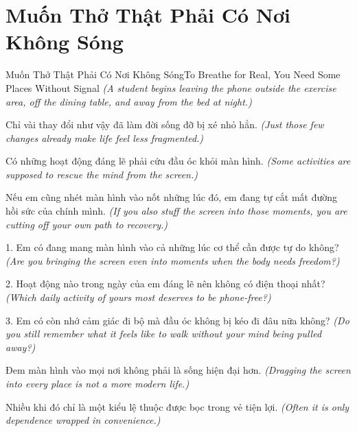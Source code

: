 \section{Muốn Thở Thật Phải Có Nơi Không Sóng}
\begin{truyen}{Muốn Thở Thật Phải Có Nơi Không Sóng}{To Breathe for Real, You Need Some Places Without Signal}
\textit{(A student begins leaving the phone outside the exercise area, off the dining table, and away from the bed at night.)}

Chỉ vài thay đổi như vậy đã làm đời sống đỡ bị xé nhỏ hẳn.
\textit{(Just those few changes already make life feel less fragmented.)}

\end{truyen}

\begin{baihoc}
Có những hoạt động đáng lẽ phải cứu đầu óc khỏi màn hình.
\textit{(Some activities are supposed to rescue the mind from the screen.)}

Nếu em cũng nhét màn hình vào nốt những lúc đó, em đang tự cắt mất đường hồi sức của chính mình.
\textit{(If you also stuff the screen into those moments, you are cutting off your own path to recovery.)}
\end{baihoc}

\begin{tuhocnhanh}
1. Em có đang mang màn hình vào cả những lúc cơ thể cần được tự do không? \textit{(Are you bringing the screen even into moments when the body needs freedom?)}

2. Hoạt động nào trong ngày của em đáng lẽ nên không có điện thoại nhất? \textit{(Which daily activity of yours most deserves to be phone-free?)}

3. Em có còn nhớ cảm giác đi bộ mà đầu óc không bị kéo đi đâu nữa không? \textit{(Do you still remember what it feels like to walk without your mind being pulled away?)}
\end{tuhocnhanh}

\begin{tongketchuong}
Đem màn hình vào mọi nơi không phải là sống hiện đại hơn.
\textit{(Dragging the screen into every place is not a more modern life.)}

Nhiều khi đó chỉ là một kiểu lệ thuộc được bọc trong vẻ tiện lợi.
\textit{(Often it is only dependence wrapped in convenience.)}
\end{tongketchuong}

\ngancach